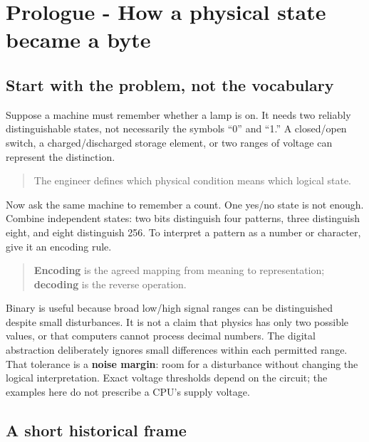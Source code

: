 \section{Prologue - How a physical state became a byte}\label{05-engine-i-ch001-prologue---how-a-physical-state-became-a-byte}

\subsection{Start with the problem, not the vocabulary}\label{05-engine-i-ch001-start-with-the-problem-not-the-vocabulary}

Suppose a machine must remember whether a lamp is on. It needs two reliably distinguishable states, not necessarily the symbols ``0'' and ``1.'' A closed/open switch, a charged/discharged storage element, or two ranges of voltage can represent the distinction.

\begin{quote}
The engineer defines which physical condition means which logical state.
\end{quote}

Now ask the same machine to remember a count. One yes/no state is not enough. Combine independent states: two bits distinguish four patterns, three distinguish eight, and eight distinguish 256. To interpret a pattern as a number or character, give it an encoding rule.

\begin{quote}
\textbf{Encoding} is the agreed mapping from meaning to representation; \textbf{decoding} is the reverse operation.
\end{quote}

Binary is useful because broad low/high signal ranges can be distinguished despite small disturbances. It is not a claim that physics has only two possible values, or that computers cannot process decimal numbers. The digital abstraction deliberately ignores small differences within each permitted range. That tolerance is a \textbf{noise margin}: room for a disturbance without changing the logical interpretation. Exact voltage thresholds depend on the circuit; the examples here do not prescribe a CPU's supply voltage.

\subsection{A short historical frame}\label{05-engine-i-ch001-a-short-historical-frame}


